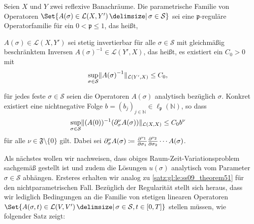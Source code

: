 \begin{Annahme}
\label{ann:ps:rg:kunoth13_assumption1}
    Seien $X$ und $Y$ zwei reflexive Banachräume.
    Die parametrische Familie von Operatoren
    $\Set{ A(\sigma) \in \mathcal L(X, Y') \given \sigma \in \mathcal S }$ sei eine $\mathfrak p$-reguläre Operatorfamilie für ein $0 < \mathfrak p \leq 1$, das heißt,
    \begin{thmenumerate}
        \item $A(\sigma) \in \mathcal L(X, Y')$ sei stetig invertierbar für alle $\sigma \in \mathcal S$ mit gleichmäßig beschränktem Inversen $A{(\sigma)}^{-1} \in \mathcal L(Y', X)$, das heißt, es existiert ein $C_{0} > 0$ mit
        \begin{equation}
            \sup_{\sigma \in \mathcal S} \lVert A{(\sigma)}^{-1}\rVert_{\mathcal L(Y', X)} \leq C_{0},
        \end{equation}
        \item für jedes feste $\sigma \in \mathcal S$ seien die Operatoren $A(\sigma)$ analytisch bezüglich $\sigma$.
        Konkret existiert eine nichtnegative Folge $b = (b_{j})_{j \in \mathbb{N}} \in \ell_{\mathfrak p}(\mathbb{N})$, so dass
        \begin{equation}
            \sup_{\sigma \in \mathcal S} \lVert(A{(0)})^{-1}(\partial^{\nu}_{\sigma} A(\sigma))\rVert_{\mathcal L(X, X)} \leq C_{0} b^{\nu}
        \end{equation}
        für alle $\nu \in \mathfrak F \setminus \{ 0 \}$ gilt.
        Dabei sei $\partial^{\nu}_{\sigma} A(\sigma) \coloneqq \frac{\partial^{\nu_{1}}}{\partial \sigma_{1}} \frac{\partial^{\nu_{2}}}{\partial \sigma_{2}} \cdots A(\sigma)$.
    \end{thmenumerate}
\end{Annahme}

Als nächstes wollen wir nachweisen, dass obiges Raum-Zeit-Variationsproblem sachgemäß gestellt ist und zudem die Lösungen $u(\sigma)$ analytisch vom Parameter $\sigma \in \mathcal S$ abhängen.
Ersteres erhalten wir analog zu \cref{satz:gl:le:ss09_theorem51} für den nichtparametrischen Fall.
Bezüglich der Regularität stellt sich heraus, dass wir lediglich Bedingungen an die Familie von stetigen linearen Operatoren $\Set{ A(\sigma, t) \in \mathcal L(V, V') \given \sigma \in \mathcal S, t \in [0, T] }$ stellen müssen, wie folgender Satz zeigt:

